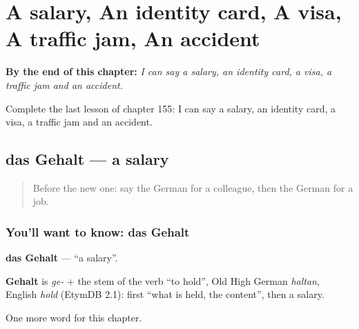 
\chapter{A salary, An identity card, A visa, A traffic jam, An accident}
\label{ch:ge-a-salary-an-identity-card-a-visa-a-traffic-jam-an-accident}

\begin{chapteropening}
\textbf{By the end of this chapter:} \emph{I can say a salary, an identity card, a visa, a traffic jam and an accident.}

Complete the last lesson of chapter 155: I can say a salary, an identity card, a visa, a traffic jam and an accident.
\end{chapteropening}

\section[das Gehalt]{das Gehalt — a salary}

\label{lesson:GE-C155-gehalt}



\begin{quote}
Before the new one: say the German for a colleague, then the German for a job.
\end{quote}

\subsection*{You'll want to know: das Gehalt}
\textbf{das Gehalt} — \textquotedblleft{}a salary\textquotedblright{}.

\begin{cousinweb}
\textbf{Gehalt} is \emph{ge-} + the stem of the verb \textquotedblleft{}to hold\textquotedblright{}, Old High German \emph{haltan}, English \emph{hold} (EtymDB 2.1): first \textquotedblleft{}what is held, the content\textquotedblright{}, then a salary.
\end{cousinweb}

\begin{grammarlens}[title={What you've built}]
One more word for this chapter.
\end{grammarlens}

